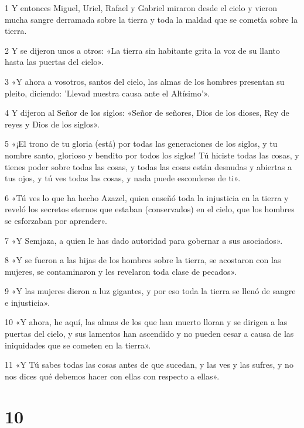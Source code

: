 \par 1 Y entonces Miguel, Uriel, Rafael y Gabriel miraron desde el cielo y vieron mucha sangre derramada sobre la tierra y toda la maldad que se cometía sobre la tierra.
\par 2 Y se dijeron unos a otros: «La tierra sin habitante grita la voz de su llanto hasta las puertas del cielo».
\par 3 «Y ahora a vosotros, santos del cielo, las almas de los hombres presentan su pleito, diciendo: 'Llevad nuestra causa ante el Altísimo'».
\par 4 Y dijeron al Señor de los siglos: «Señor de señores, Dios de los dioses, Rey de reyes y Dios de los siglos».
\par 5 «¡El trono de tu gloria (está) por todas las generaciones de los siglos, y tu nombre santo, glorioso y bendito por todos los siglos! Tú hiciste todas las cosas, y tienes poder sobre todas las cosas, y todas las cosas están desnudas y abiertas a tus ojos, y tú ves todas las cosas, y nada puede esconderse de ti».
\par 6 «Tú ves lo que ha hecho Azazel, quien enseñó toda la injusticia en la tierra y reveló los secretos eternos que estaban (conservados) en el cielo, que los hombres se esforzaban por aprender».
\par 7 «Y Semjaza, a quien le has dado autoridad para gobernar a sus asociados».
\par 8 «Y se fueron a las hijas de los hombres sobre la tierra, se acostaron con las mujeres, se contaminaron y les revelaron toda clase de pecados».
\par 9 «Y las mujeres dieron a luz gigantes, y por eso toda la tierra se llenó de sangre e injusticia».
\par 10 «Y ahora, he aquí, las almas de los que han muerto lloran y se dirigen a las puertas del cielo, y sus lamentos han ascendido y no pueden cesar a causa de las iniquidades que se cometen en la tierra».
\par 11 «Y Tú sabes todas las cosas antes de que sucedan, y las ves y las sufres, y no nos dices qué debemos hacer con ellas con respecto a ellas».

\chapter{10}


